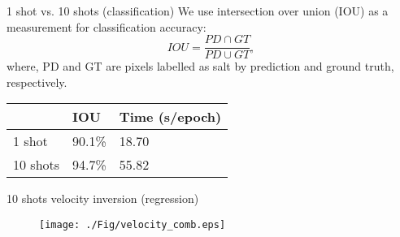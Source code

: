 \documentclass[aspectratio=169]{beamer}
\begin{document}
\begin{frame}{}
\end{frame}
\begin{frame}{}
\end{frame}
\begin{frame}{1 shot vs. 10 shots (classification)}
\noindent 
We use intersection over union (IOU) as a measurement for classification accuracy:
\begin{equation}
IOU=\frac{PD \cap GT}{PD \cup GT},
\end{equation}
where, PD and GT are pixels labelled as salt by prediction and ground truth, respectively.
\begin{table}[]
\centering
\label{Comparison}
\begin{tabular}{|l|l|l|}
\hline
         & IOU    & Time (s/epoch) \\ \hline
1 shot   & 90.1\% & 18.70          \\ \hline
10 shots & 94.7\% & 55.82          \\ \hline
\end{tabular}
\end{table}
\end{frame}
\begin{frame}{10 shots velocity inversion (regression)}
\begin{figure}[ht]
\centering
 \texttt{[image: ./Fig/velocity\_comb.eps]}
\end{figure}
\end{frame}
\end{document}
